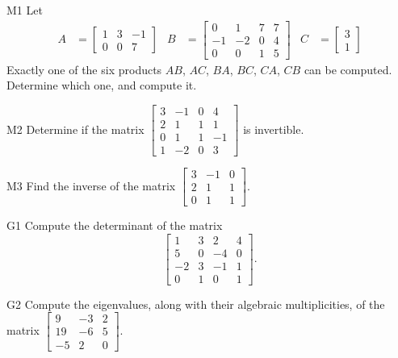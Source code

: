 \documentclass{sbgLAexam}
\begin{document}
\begin{problem}{M1}
Let
\begin{align*}
A &= \begin{bmatrix} 1 & 3 & -1  \\ 0 & 0 & 7  \end{bmatrix} & B &= \begin{bmatrix} 0 & 1 & 7 & 7 \\ -1 & -2 & 0 & 4 \\ 0 & 0 & 1 & 5 \end{bmatrix} & C&=\begin{bmatrix} 3  \\  1 \end{bmatrix}
\end{align*}
Exactly one of the six products $AB$, $AC$, $BA$, $BC$, $CA$, $CB$ can be computed.  Determine which one, and compute it.
\end{problem}

\begin{problem}{M2}
Determine if the matrix $\begin{bmatrix} 3 & -1 & 0 & 4 \\ 2 & 1 & 1 & 1 \\ 0 & 1 & 1 & -1 \\ 1 & -2 & 0 & 3 \end{bmatrix}$ is invertible.
\end{problem}
\newpage

\begin{problem}{M3}
Find the inverse of the matrix $\begin{bmatrix} 3 & -1 & 0  \\ 2 & 1 & 1  \\ 0 & 1 & 1   \end{bmatrix}$.
\end{problem}

\begin{problem}{G1}
Compute the determinant of the matrix
\[
  \begin{bmatrix}
    1 & 3 & 2 & 4 \\
    5 & 0 & -4 & 0 \\
    -2 & 3 & -1 & 1 \\
    0 & 1 & 0 & 1
  \end{bmatrix}
.\]
\end{problem}
\newpage

\begin{problem}{G2}
Compute the eigenvalues, along with their algebraic multiplicities, of the matrix $ \begin{bmatrix} 9 & -3 & 2 \\ 19 & -6 & 5 \\ -5 & 2 & 0 \end{bmatrix}$.
\end{problem}
\end{document}
